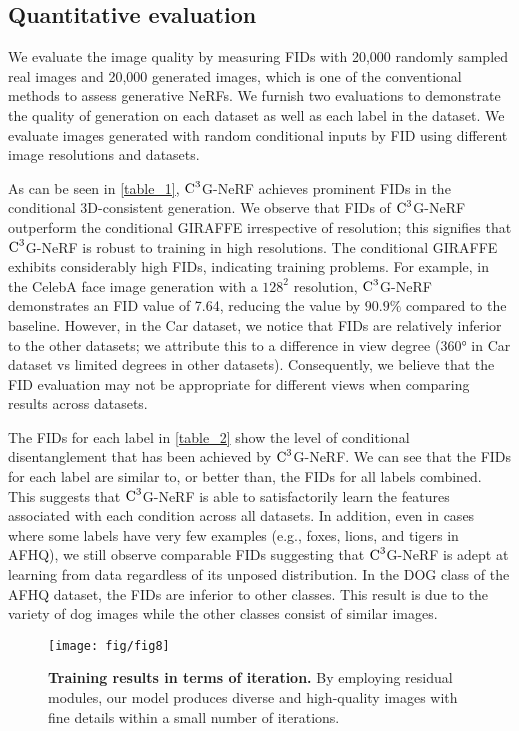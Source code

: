\documentclass[nohyperref]{article}
\theoremstyle{plain}
\theoremstyle{definition}
\theoremstyle{remark}
\begin{document}
\subsection{Quantitative evaluation}
We evaluate the image quality by measuring FIDs with 20,000 randomly sampled real images and 20,000 generated images, which is one of the conventional methods to assess generative NeRFs. We furnish two evaluations to demonstrate the quality of generation on each dataset as well as each label in the dataset. We evaluate images generated with random conditional inputs by FID using different image resolutions and datasets.


As can be seen in \cref{table_1}, $\textnormal{C}^{3}$G-NeRF achieves prominent FIDs in the conditional 3D-consistent generation. We observe that FIDs of $\textnormal{C}^{3}$G-NeRF outperform the conditional GIRAFFE irrespective of resolution; this signifies that $\textnormal{C}^{3}$G-NeRF is robust to training in high resolutions. The conditional GIRAFFE exhibits considerably high FIDs, indicating training problems. For example, in the CelebA face image generation with a $128^{2}$ resolution, $\textnormal{C}^{3}$G-NeRF demonstrates an FID value of 7.64, reducing the value by $90.9\%$ compared to the baseline. However, in the Car dataset, we notice that FIDs are relatively inferior to the other datasets; we attribute this to a difference in view degree (360° in Car dataset vs limited degrees in other datasets). Consequently, we believe that the FID evaluation may not be appropriate for different views when comparing results across datasets.


The FIDs for each label in \cref{table_2} show the level of conditional disentanglement that has been achieved by $\textnormal{C}^{3}$G-NeRF. We can see that the FIDs for each label are similar to, or better than, the FIDs for all labels combined. This suggests that $\textnormal{C}^{3}$G-NeRF is able to satisfactorily learn the features associated with each condition across all datasets. In addition, even in cases where some labels have very few examples (e.g., foxes, lions, and tigers in AFHQ), we still observe comparable FIDs suggesting that $\textnormal{C}^{3}$G-NeRF is adept at learning from data regardless of its unposed distribution. In the DOG class of the AFHQ dataset, the FIDs are inferior to other classes. This result is due to the variety of dog images while the other classes consist of similar images.

\begin{figure}[t]
\begin{center}
\centerline{\texttt{[image: fig/fig8]}}
\caption{\textbf{Training results in terms of iteration.} By employing residual modules, our model produces diverse and high-quality images with fine details within a small number of iterations.}
\label{figure_8}
\end{center}
\vskip -0.2in
\end{figure}
\end{document}
